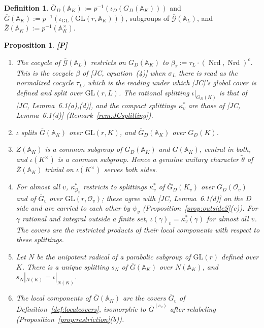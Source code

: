 \documentclass[12pt]{article}
\newcommand{\ov}[1]{\overline{#1}}
\newcommand{\A}{\mathbb{A}}
\newcommand{\cO}{\mathcal{O}}
\newcommand{\Nrd}{\operatorname{Nrd}}
\newcommand{\GL}{\mathrm{GL}}
\newcommand{\Gb}{\ov{G}}
\newcommand{\Zb}{\ov{Z}}
\newcommand{\GDb}{\ov{G}_D}
\newcommand{\ks}{\kappa^{*}}
\newcommand{\cG}{\mathcal{G}}
\newcommand{\cGb}{\ov{\mathcal{G}}}
\newcommand{\iD}{\iota_D}
\newcommand{\iG}{\iota_{\GL}}
\newcommand{\Pv}{\textbf{[P]}}
\theoremstyle{plain}
\newtheorem{proposition}[theorem]{Proposition}
\theoremstyle{definition}
\newtheorem{definition}[theorem]{Definition}
\begin{document}
\begin{definition}
$\GDb(\A_K):=p^{-1}(\iD(G_D(\A_K)))$ and $\Gb(\A_K):=p^{-1}(\iG(\GL(r,\A_K)))$, subgroups of $\cGb(\A_L)$, and $\Zb(\A_K):=p^{-1}(\A_K^\times)$.
\end{definition}

\begin{proposition}\label{prop:global}\Pv
\begin{enumerate}[label=(\alph*)]
\item The cocycle of $\cGb(\A_L)$ restricts on $G_D(\A_K)$ to $\beta_\tau:=\tau_L\cdot(\Nrd,\Nrd)^c$. This is the cocycle $\beta$ of [JC, equation~(4)] when $\sigma_L$ there is read as the normalized cocycle $\tau_L$, which is the reading under which [JC]'s global cover is defined and split over $\GL(r,L)$. The rational splitting $\iota|_{G_D(K)}$ is that of [JC, Lemma~6.1(a),(d)], and the compact splittings $\ks_v$ are those of [JC, Lemma~6.1(d)] (Remark~\ref{rem:JCsplitting}).
\item $\iota$ splits $\Gb(\A_K)$ over $\GL(r,K)$, and $\GDb(\A_K)$ over $G_D(K)$.
\item $\Zb(\A_K)$ is a common subgroup of $\GDb(\A_K)$ and $\Gb(\A_K)$, central in both, and $\iota(K^\times)$ is a common subgroup. Hence a genuine unitary character $\tilde\theta$ of $\Zb(\A_K)$ trivial on $\iota(K^\times)$ serves both sides.
\item For almost all $v$, $\ks_{\cG_v}$ restricts to splittings $\ks_v$ of $\GDb(K_v)$ over $G_D(\cO_v)$ and of $\Gb_v$ over $\GL(r,\cO_v)$; these agree with [JC, Lemma~6.1(d)] on the $D$ side and are carried to each other by $\psi_v$ (Proposition~\ref{prop:outsideS}(c)). For $\gamma$ rational and integral outside a finite set, $\iota(\gamma)_v=\ks_v(\gamma)$ for almost all $v$. The covers are the restricted products of their local components with respect to these splittings.
\item Let $N$ be the unipotent radical of a parabolic subgroup of $\GL(r)$ defined over $K$. There is a unique splitting $s_N$ of $\Gb(\A_K)$ over $N(\A_K)$, and $s_N|_{N(K)}=\iota|_{N(K)}$.
\item The local components of $\Gb(\A_K)$ are the covers $\Gb_v$ of Definition~\ref{def:localcovers}, isomorphic to $\Gb^{(c_v)}$ after relabeling (Proposition~\ref{prop:restriction}(b)).
\end{enumerate}
\end{proposition}
\end{document}
